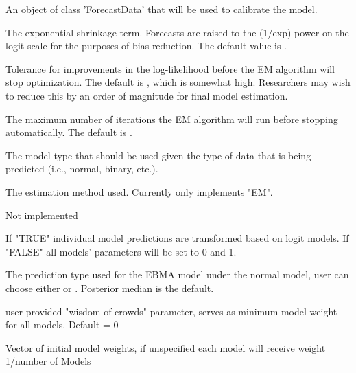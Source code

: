 \documentclass[a4paper]{book}
\begin{document}
\begin{Arguments}
\begin{ldescription}
\item[\code{.forecastData}] An object of class 'ForecastData' that will be used to calibrate the model.

\item[\code{exp}] The exponential shrinkage term.  Forecasts are raised to the (1/exp) power on the logit scale for the purposes of bias reduction.  The default value is .

\item[\code{tol}] Tolerance for improvements in the log-likelihood before the EM algorithm will stop optimization.  The default is , which is somewhat high.  Researchers may wish to reduce this by an order of magnitude for final model estimation.

\item[\code{maxIter}] The maximum number of iterations the EM algorithm will run before stopping automatically. The default is .

\item[\code{model}] The model type that should be used given the type of data that is being predicted (i.e., normal, binary, etc.).

\item[\code{method}] The estimation method used.  Currently only implements "EM".

\item[\code{...}] Not implemented

\item[\code{useModelParams}] If "TRUE" individual model predictions are transformed based on logit models. If "FALSE" all models' parameters will be set to 0 and 1.

\item[\code{predType}] The prediction type used for the EBMA model under the normal model, user can choose either  or . Posterior median is the default.

\item[\code{const}] user provided "wisdom of crowds" parameter, serves as minimum model weight for all models. Default = 0

\item[\code{W}] Vector of initial model weights, if unspecified each model will receive weight 1/number of Models
\end{ldescription}
\end{Arguments}
\end{document}
